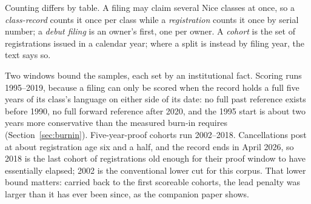 Counting differs by table. A filing may claim several Nice classes at
once, so a \emph{class-record} counts it once per class while a
\emph{registration} counts it once by serial number; a \emph{debut
filing} is an owner's first, one per owner. A \emph{cohort} is the set of
registrations issued in a calendar year; where a split is instead by
filing year, the text says so.

Two windows bound the samples, each set by an institutional fact.
Scoring runs 1995--2019, because a filing can only be scored when the
record holds a full five years of its class's language on either side of
its date: no full past reference exists before 1990, no full forward
reference after 2020, and the 1995 start is about two years more
conservative than the measured burn-in requires
(Section~\ref{sec:burnin}). Five-year-proof cohorts run 2002--2018.
Cancellations post at about registration age six and a half, and the
record ends in April 2026, so 2018 is the last cohort of registrations
old enough for their proof window to have essentially elapsed; 2002 is
the conventional lower cut for this corpus. That lower bound matters:
carried back to the first scoreable cohorts, the lead penalty was larger
than it has ever been since, as the companion paper shows.


